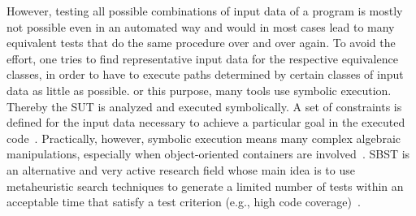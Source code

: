 \documentclass{article}
\begin{document}


However, testing all possible combinations of input data of a program is mostly not possible even in an automated way and would in most cases lead to many equivalent tests that do the same procedure over and over again. To avoid the effort, one tries to find representative input data for the respective equivalence classes, in order to have to execute paths determined by certain classes of input data as little as possible. or this purpose, many tools use symbolic execution. Thereby the \ac{SUT} is analyzed and executed symbolically. A set of constraints is defined for the input data necessary to achieve a particular goal in the executed code~\cite{Clarke1976}. Practically, however, symbolic execution means many complex algebraic manipulations, especially when object-oriented containers are involved~\cite{Korel1990}. \ac{SBST} is an alternative and very active research field whose main idea is to use metaheuristic search techniques to generate a limited number of tests within an acceptable time that satisfy a test criterion (e.g., high code coverage)~\cite{McMinn_2004}. 
\end{document}
